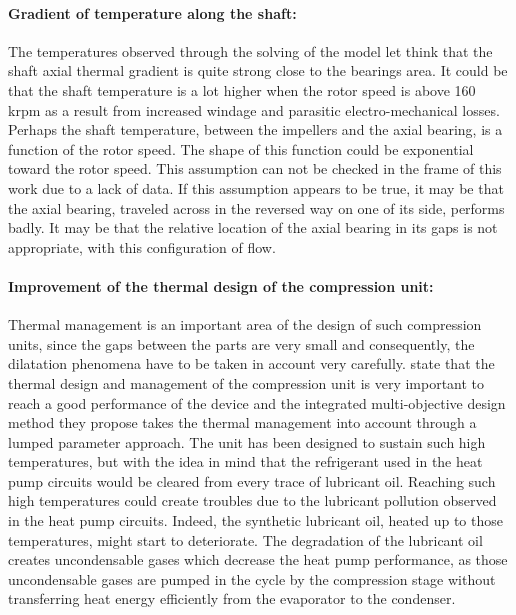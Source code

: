 \paragraph{Gradient of temperature along the shaft:}

The temperatures observed through the solving of the \AWP{} model let
think that the shaft axial thermal gradient is quite strong close to
the bearings area. It could be that the shaft temperature is a lot
higher when the rotor speed is above 160 krpm as a result from
increased windage and parasitic electro-mechanical losses. Perhaps the
shaft temperature, between the impellers and the axial bearing, is a
function of the rotor speed. The shape of this function could be
exponential toward the rotor speed. This assumption can not be checked
in the frame of this work due to a lack of data. If this assumption
appears to be true, it may be that the axial bearing, traveled across
in the reversed way on one of its side, performs badly. It may be that
the relative location of the axial bearing in its gaps is not
appropriate, with this configuration of flow.


\paragraph{Improvement of the thermal design of the
  compression unit:}

Thermal management is an important area of the design of such
compression units, since the gaps between the parts are very small and
consequently, the dilatation phenomena have to be taken in account
very carefully. \citet[p.\,3]{Schiffmann-Favrat-2010b} state that the
thermal design and management of the compression unit is very
important to reach a good performance of the device and the integrated
multi-objective design method they propose takes the thermal
management into account through a lumped parameter approach. The unit
has been designed to sustain such high temperatures, but with the idea
in mind that the refrigerant used in the heat pump circuits would be
cleared from every trace of lubricant oil. Reaching such high
temperatures could create troubles due to the lubricant pollution
observed in the heat pump circuits. Indeed, the synthetic
lubricant oil, heated up to those temperatures, might start to
deteriorate. The degradation of the lubricant oil creates
uncondensable gases which decrease the heat pump performance, as
those uncondensable gases are pumped in the cycle by the compression
stage without transferring heat energy efficiently from the evaporator
to the condenser.

